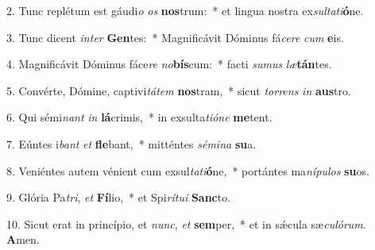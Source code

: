 2. Tunc replétum est gáudi\textit{o} \textit{os} \textbf{nos}trum:~*  et lingua nostra ex\textit{sul}\textit{ta}\textit{ti}\textbf{ó}ne.\

3. Tunc dicent \textit{in}\textit{ter} \textbf{Gen}tes:~*  Magnificávit Dóminus fá\textit{ce}\textit{re} \textit{cum} \textbf{e}is.\

4. Magnificávit Dóminus fáce\textit{re} \textit{no}\textbf{bís}cum:~*  facti \textit{su}\textit{mus} \textit{læ}\textbf{tán}tes.\

5. Convérte, Dómine, captivi\textit{tá}\textit{tem} \textbf{nos}tram,~*  sicut \textit{tor}\textit{rens} \textit{in} \textbf{aus}tro.\

6. Qui sémi\textit{nant} \textit{in} \textbf{lá}crimis,~*  in exsulta\textit{ti}\textit{ó}\textit{ne} \textbf{me}tent.\

7. Eúntes i\textit{bant} \textit{et} \textbf{fle}bant,~*  mitténtes \textit{sé}\textit{mi}\textit{na} \textbf{su}a.\

8. Veniéntes autem vénient cum exsul\textit{ta}\textit{ti}\textbf{ó}ne,~*  portántes ma\textit{ní}\textit{pu}\textit{los} \textbf{su}os.\

9. Glória Pa\textit{tri}, \textit{et} \textbf{Fí}lio,~*  et Spi\textit{rí}\textit{tu}\textit{i} \textbf{Sanc}to.\

10. Sicut erat in princípio, et \textit{nunc}, \textit{et} \textbf{sem}per,~*  et in sǽcula sæ\textit{cu}\textit{ló}\textit{rum}. \textbf{A}men.\

